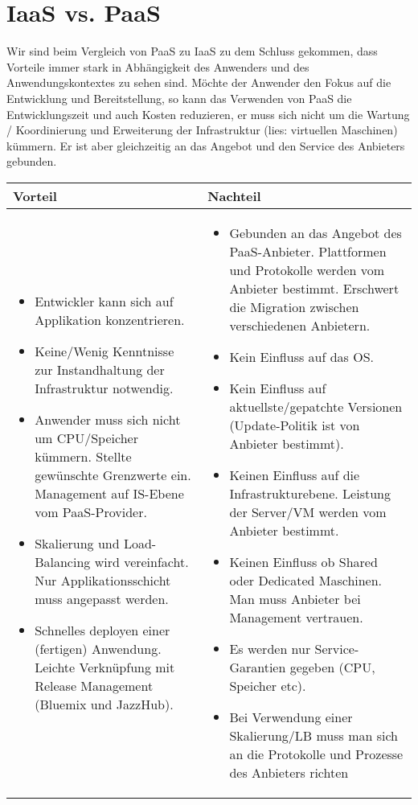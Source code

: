 \section{IaaS vs. PaaS}
Wir sind beim Vergleich von PaaS zu IaaS zu dem Schluss gekommen, dass Vorteile immer stark in
Abhängigkeit des Anwenders und des Anwendungskontextes zu sehen sind. Möchte der Anwender den Fokus auf die Entwicklung und
Bereitstellung, so kann das Verwenden von PaaS die Entwicklungszeit und auch Kosten reduzieren, er
muss sich nicht um die Wartung / Koordinierung und Erweiterung der Infrastruktur (lies: virtuellen
Maschinen) kümmern. Er ist aber gleichzeitig an das Angebot und den Service des Anbieters gebunden.
\begin{table}[h]
\centering
\begin{tabular}{p{7cm} p{7cm} }
\toprule
Vorteil & Nachteil \\
\midrule
\begin{itemize}
  \item Entwickler kann sich auf Applikation konzentrieren.
  \item Keine/Wenig Kenntnisse zur Instandhaltung der Infrastruktur notwendig.
  \item Anwender muss sich nicht um CPU/Speicher kümmern. Stellte gewünschte Grenzwerte ein.
   Management auf IS-Ebene vom PaaS-Provider.
   \item Skalierung und Load-Balancing wird vereinfacht. Nur Applikationsschicht muss angepasst
   werden.
 \item Schnelles deployen einer (fertigen) Anwendung. Leichte Verknüpfung mit Release Management
 	(Bluemix und JazzHub).
\end{itemize}& 
\begin{itemize}
\item Gebunden an das Angebot des PaaS-Anbieter. Plattformen und Protokolle werden vom Anbieter
bestimmt.  Erschwert die Migration zwischen verschiedenen Anbietern.
\item Kein Einfluss auf das OS. 
\item Kein Einfluss auf aktuellste/gepatchte Versionen (Update-Politik ist von Anbieter bestimmt).
\item Keinen Einfluss auf die Infrastrukturebene. Leistung der Server/VM werden vom Anbieter bestimmt. 
\item Keinen Einfluss ob Shared oder Dedicated Maschinen. Man muss Anbieter bei Management vertrauen.
\item Es werden nur Service-Garantien gegeben (CPU, Speicher etc).
\item Bei Verwendung einer Skalierung/LB muss man sich an die Protokolle und Prozesse des Anbieters richten
\end{itemize}\\
\bottomrule
\end{tabular}
\end{table}
